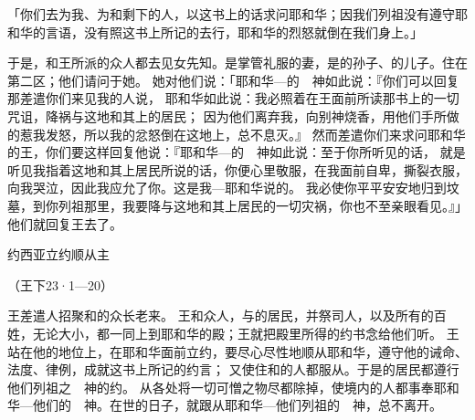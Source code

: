 {「你们去为我、为{}和{}剩下的人，以这书上的话求问耶和华；因我们列祖没有遵守耶和华的言语，没有照这书上所记的去行，耶和华的烈怒就倒在我们身上。」
\par }{\PP {}于是，{}和王所派的众人都去见女先知{}。{}是掌管礼服{}的妻，{}是{}的孙子、{}的儿子。{}住在{}第二区；他们请问于她。
她对他们说：「耶和华—{}的　神如此说：『你们可以回复那差遣你们来见我的人说，
耶和华如此说：我必照着在{}王面前所读那书上的一切咒诅，降祸与这地和其上的居民；
因为他们离弃我，向别神烧香，用他们手所做的惹我发怒，所以我的忿怒{}倒在这地上，总不息灭。』
然而差遣你们来求问耶和华的{}王，你们要这样回复他说：『耶和华—{}的　神如此说：至于你所听见的话，
就是听见我指着这地和其上居民所说的话，你便心里敬服，在我面前自卑，撕裂衣服，向我哭泣，因此我应允了你。这是我—耶和华说的。
我必使你平平安安地归到坟墓，到你列祖那里，我要降与这地和其上居民的一切灾祸，你也不至亲眼看见。』」他们就回复王去了。
\par }{\SH 约西亚立约顺从主
\par }{\R （王下23·1—20）
\par }{\PP {}王差遣人招聚{}和{}的众长老来。
王和{}众人，与{}的居民，并祭司{}人，以及所有的百姓，无论大小，都一同上到耶和华的殿；王就把殿里所得的约书念给他们听。
王站在他的地位上，在耶和华面前立约，要尽心尽性地顺从耶和华，遵守他的诫命、法度、律例，成就这书上所记的约言；
又使住{}和{}的人都服从{}。于是{}的居民都遵行他们列祖之　神的约。
从{}各处将一切可憎之物尽都除掉，使{}境内的人都事奉耶和华—他们的　神。{}在世的日子，就跟从耶和华—他们列祖的　神，总不离开。

}
